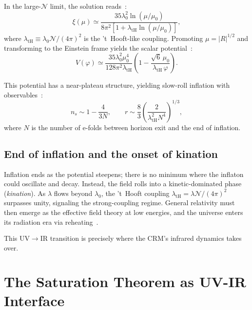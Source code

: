 \documentclass[aps,prd,twocolumn,superscriptaddress,nofootinbib]{revtex4-2}
\begin{document}
In the large-$\mathcal{N}$ limit, the solution reads~\cite{LiuQuintinAfshordi2026}:
\begin{equation}
\xi(\mu) \simeq \frac{35\lambda_0^2\ln(\mu/\mu_0)}{8\pi^2[1 + \lambda_\mathrm{tH}\ln(\mu/\mu_0)]},
\label{eq:xi-solution}
\end{equation}
where $\lambda_\mathrm{tH} \equiv \lambda_0\mathcal{N}/(4\pi)^2$ is the 't~Hooft-like coupling. Promoting $\mu = |R|^{1/2}$ and transforming to the Einstein frame yields the scalar potential~\cite{LiuQuintinAfshordi2026}:
\begin{equation}
V(\varphi) \simeq \frac{35\lambda_0^2\mu_0^4}{128\pi^2\lambda_\mathrm{tH}}\left(1 - \frac{\sqrt{6}\,\mu_0}{\lambda_\mathrm{tH}\,\varphi}\right).
\label{eq:einstein-potential}
\end{equation}

This potential has a near-plateau structure, yielding slow-roll inflation with observables~\cite{LiuQuintinAfshordi2026}:
\begin{equation}
n_s \sim 1 - \frac{4}{3N}, \qquad r \sim \frac{8}{3}\left(\frac{2}{\lambda_\mathrm{tH}^2 N^4}\right)^{1/3},
\label{eq:ns-r}
\end{equation}
where $N$ is the number of e-folds between horizon exit and the end of inflation.

\subsection{End of inflation and the onset of kination}

Inflation ends as the potential steepens; there is no minimum where the inflaton could oscillate and decay. Instead, the field rolls into a kinetic-dominated phase (\textit{kination}). As $\lambda$ flows beyond $\lambda_0$, the 't~Hooft coupling $\lambda_\mathrm{tH} = \lambda\mathcal{N}/(4\pi)^2$ surpasses unity, signaling the strong-coupling regime. General relativity must then emerge as the effective field theory at low energies, and the universe enters its radiation era via reheating~\cite{LiuQuintinAfshordi2026}.

This UV$\to$IR transition is precisely where the CRM's infrared dynamics takes over.


\section{The Saturation Theorem as UV-IR Interface}
\label{sec:interface}
\end{document}
